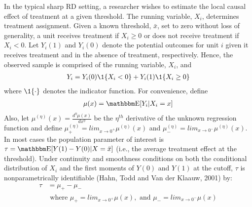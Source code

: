 \documentclass[12pt,fleqn]{article}
\begin{document}
In the typical sharp RD setting, a researcher wishes to estimate the local 
causal effect of treatment at a given threshold. The running variable, $X_{i}$, 
determines treatment assignment.  Given a known threshold, $\bar{x}$, set to 
zero without loss of generality, a unit receives treatment if $X_{i} \geq 0$ or 
does not receive treatment if $X_{i} < 0$. Let $Y_{i}(1)$ and $Y_{i}(0)$ denote 
the potential outcomes for unit $i$ given it receives treatment and
 in the absence of treatment, respectively. Hence, the observed sample is 
 comprised of the running variable, $X_{i}$, and
 \begin{align}
  Y_{i}=Y_{i}(0) \1\{X_{i}<0\}+Y_{i}(1) \1\{X_{i} \geq 0\}
 \end{align}
where $\1\{ \cdot\}$ denotes the indicator function. For convenience,
define
 \begin{align}
  \mu(x)= \E[Y_{i}|X_{i}=x]
 \end{align}
Also, let $\mu^{(\eta)}(x)=\frac{d^{\eta}\mu(x)}{dx^{\eta}}$ be the $\eta^{th}$ 
derivative of the unknown regression function and define 
$\mu^{(\eta)}_{+}=lim_{x \rightarrow 0^{+}}\mu^{(\eta)}(x)$ and 
$\mu^{(\eta)}_{-}=lim_{x \rightarrow 0^{-}}\mu^{(\eta)}(x)$.
In most cases the population parameter of interest is 
$\tau=\E[Y(1)-Y(0)|X=\bar{x}]$ (i.e., the average treatment effect
at the threshold). Under continuity and smoothness conditions on both the 
conditional distribution of $X_i$ and the first moments of $Y(0)$ and $Y(1)$ at
the cutoff, $\tau$ is nonparametrically identifiable (Hahn, Todd and Van der 
Klaauw, 2001) by:
\begin{align}
 \tau&= \mu_{+}- \mu_{-} \nonumber \\ 
&\text{ where } \mu_{+}=lim_{x \rightarrow 0^{+}}\mu(x),\text{ and } 
\mu_{-}=lim_{x \rightarrow 0^{-}}\mu(x)
\end{align}
\end{document}
